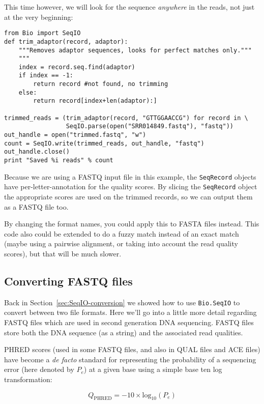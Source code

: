 \documentclass{report}
\begin{document}
This time however, we will look for the sequence \emph{anywhere} in the reads,
not just at the very beginning:

\begin{verbatim}
from Bio import SeqIO
def trim_adaptor(record, adaptor):
    """Removes adaptor sequences, looks for perfect matches only."""
    """
    index = record.seq.find(adaptor)
    if index == -1:
        return record #not found, no trimming
    else:
        return record[index+len(adaptor):]

trimmed_reads = (trim_adaptor(record, "GTTGGAACCG") for record in \
                 SeqIO.parse(open("SRR014849.fastq"), "fastq")) 
out_handle = open("trimmed.fastq", "w") 
count = SeqIO.write(trimmed_reads, out_handle, "fastq") 
out_handle.close() 
print "Saved %i reads" % count
\end{verbatim}

Because we are using a FASTQ input file in this example, the \verb|SeqRecord|
objects have per-letter-annotation for the quality scores. By slicing the
\verb|SeqRecord| object the appropriate scores are used on the trimmed
records, so we can output them as a FASTQ file too.

By changing the format names, you could apply this to FASTA files instead.
This code also could be extended to do a fuzzy match instead of an exact
match (maybe using a pairwise alignment, or taking into account the read
quality scores), but that will be much slower.

\subsection{Converting FASTQ files}
\label{sec:SeqIO-fastq-conversion}

Back in Section~\ref{sec:SeqIO-conversion} we showed how to use
\verb|Bio.SeqIO| to convert between two file formats. Here we'll go into a
little more detail regarding FASTQ files which are used in second generation
DNA sequencing. FASTQ files store both the DNA sequence (as a string) and
the associated read qualities.

PHRED scores (used in some FASTQ files, and also in QUAL files and ACE
files) have become a \textit{de facto} standard for representing the
probability of a sequencing error (here denoted by $P_e$) at a given
base using a simple base ten log transformation:

\begin{equation}
Q_{\textrm{PHRED}} = - 10 \times \textrm{log}_{10} ( P_e )
\end{equation}
\end{document}
